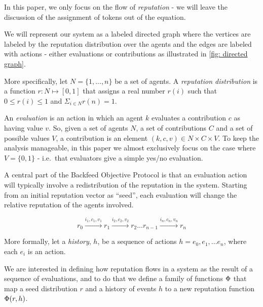 \documentclass{article}
\begin{document}
In this paper, we only focus on the flow of {\em reputation}  - we will leave the discussion of the assignment of tokens out of the equation.

We will represent our system as a labeled directed graph where the vertices are labeled
by the reputation distribution over the agents and the edges are labeled with actions - either evaluations or contributions as illustrated in \cref{fig: directed graph}.

More specifically, let $N=\{1, ..., n\}$ be a set of agents. 
A {\em reputation distribution} is a function $r: N \mapsto [0,1]$ that assigns a real number $r(i)$ such that $0 \leq r(i) \leq 1$ and $\Sigma_{i \in N} r(n) = 1$. 

An {\em evaluation} is an action in which an agent $k$ evaluates a contribution $c$ as having value $v$.
So, given a set of agents $N$, a set of contributions $C$ and a set of possible values $V$, a contribution is an element $(k,c,v) \in N \times C \times V$.
To keep the analysis manageable, in this paper we almost exclusively focus on the case where $V= \{0, 1\}$ - i.e.\ that evaluators give a simple yes/no evaluation.

A central part of the Backfeed Objective Protocol is that an evaluation action will typically involve a redistribution of the reputation in the system. Starting from an initial reputation vector as ``seed'', each evaluation will change the relative reputation of the agents involved. 

\begin{equation}
r_0 \xrightarrow{i_1, c_1, v_1} r_1 \xrightarrow{i_2, c_2, v_2} r_2 ... r_{n-1} \xrightarrow{i_n, c_n, v_n} r_n
\end{equation}

More formally, let a {\em history}, $h$, be a sequence of actions $h = e_0, e_1, ...  e_n$, where each $e_i$ is an action.

We are interested in defining how reputation flows in a system as the result of a sequence of evaluations, and to do that we define a family of functions $\Phi$ that map a seed distribution $r$ and a history of events $h$ to a new reputation function $\Phi(r, h)$. 
\end{document}
